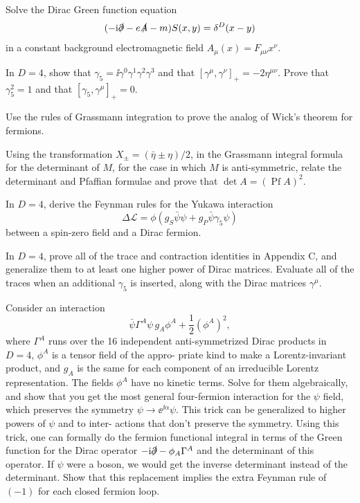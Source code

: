 \begin{banksproblems}
Solve the Dirac Green function equation
\begin{equation*}
  (-\mathrm{i}\slashed\partial-e\slashed A-m)S(x,y)=\delta^D(x-y)
\end{equation*}
in a constant background electromagnetic field $A_\mu(x)=F_{\mu\nu}x^\nu$.

In $D=4$, show that $\gamma_5=\ii\gamma^0\gamma^1\gamma^2\gamma^3$ and that
$[\gamma^\mu,\gamma^\nu]_+=-2\eta^{\mu\nu}$. Prove that $\gamma_5^2=1$ and that
$[\gamma_5,\gamma^\mu]_+=0$.

Use the rules of Grassmann integration to prove the analog of Wick’s theorem
for fermions.

Using the transformation $X_\pm=(\bar\eta\pm\eta)/2$, in the Grassmann integral formula
for the determinant of $M$, for the case in which $M$ is anti-symmetric, relate the
determinant and Pfaffian formulae and prove that $\det A=(\operatorname{Pf}A)^2$.

In $D=4$, derive the Feynman rules for the Yukawa interaction
\begin{equation*}
  \Delta\mathcal{L}=\phi(g_S\bar\psi\psi+g_P\bar\psi\gamma_5\psi)
\end{equation*}
between a spin-zero field and a Dirac fermion.

In $D=4$, prove all of the trace and contraction identities in Appendix C, and generalize
them to at least one higher power of Dirac matrices. Evaluate all of the traces
when an additional $\gamma_5$ is inserted, along with the Dirac matrices $\gamma^\mu$.

Consider an interaction
\begin{equation*}
  \bar\psi\Gamma^A\psi\,g_A\phi^A+\frac12(\phi^A)^2,
\end{equation*}
where $\Gamma^A$ runs over the 16 independent anti-symmetrized Dirac products in $D=4$, $\phi^A$ is a tensor field of the appro-
priate kind to make a Lorentz-invariant product, and $g_A$ is the same for each
component of an irreducible Lorentz representation. The fields $\phi^A$ have no
kinetic terms. Solve for them algebraically, and show that you get the most
general four-fermion interaction for the $\psi$ field, which preserves the symmetry
$\psi\to\ee^{\ii\alpha}\psi$. This trick can be generalized to higher powers of $\psi$ and to inter-
actions that don’t preserve the symmetry. Using this trick, one can formally do the
fermion functional integral in terms of the Green function for the Dirac
operator $-\mathrm{i}\slashed\partial-\phi_A\Gamma^A$ and the determinant of this operator. If $\psi$ were a
boson, we would get the inverse determinant instead of the determinant. Show
that this replacement implies the extra Feynman rule of $(-1)$ for each closed
fermion loop.


\end{banksproblems}
